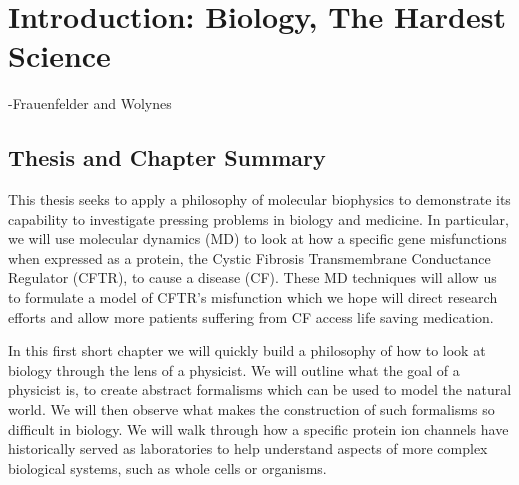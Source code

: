 \chapter{Introduction: Biology, The Hardest Science}
\setcounter{page}{1}
\label{chap:intro}
 {-Frauenfelder and Wolynes \cite{frauenfelder1994}}
\vspace
\section{Thesis and Chapter Summary}

This thesis seeks to apply a philosophy of molecular biophysics to demonstrate its capability to investigate pressing problems in biology and medicine. In particular, we will use molecular dynamics (MD) to look at how a specific gene misfunctions when expressed as a protein, the Cystic Fibrosis Transmembrane Conductance Regulator (CFTR), to cause a disease (CF). These MD techniques will allow us to formulate a model of CFTR's misfunction which we hope will direct research efforts and allow more patients suffering from CF access life saving medication. 

In this first short chapter we will quickly build a philosophy of how to look at biology through the lens of a physicist. We will outline what the goal of a physicist is, to create abstract formalisms which can be used to model the natural world. We will then observe what makes the construction of such formalisms so difficult in biology. We will walk through how a specific protein ion channels have historically served as laboratories to help understand aspects of more complex biological systems, such as whole cells or organisms. 


